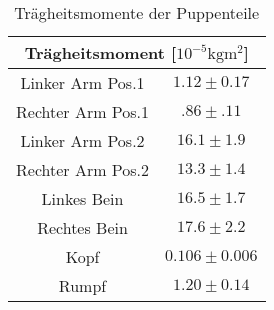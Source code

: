 \begin{table}[ht]
	\centering
	\begin{tabular}{cc}
	\toprule
	\multicolumn{2}{c}{Trägheitsmoment [$10^{-5} \si{\kilo\gram\meter\squared}$]}\\
	\midrule
	Linker Arm Pos.1 &$1.12\pm0.17$\\
	Rechter Arm Pos.1 &$.86\pm.11$\\
	Linker Arm Pos.2 &$16.1\pm1.9$\\
	Rechter Arm Pos.2 &$13.3\pm1.4$\\
	Linkes Bein&$16.5\pm1.7$\\
	Rechtes Bein&$17.6\pm2.2$\\
	Kopf&$0.106\pm0.006$\\
	Rumpf&$1.20\pm0.14$\\
	\bottomrule
	\end{tabular}
	\caption{Trägheitsmomente der Puppenteile}
	\label{tab:M8 Tragheit}	
\end{table}